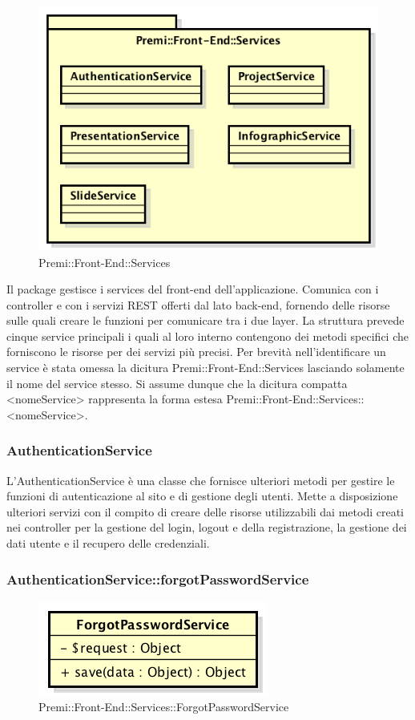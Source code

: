 \begin{figure}[h]
	\centering
	\includegraphics[width=0.7\linewidth]{img/premi_front_end_services}
	\caption[Premi::Front-End::Services]{Premi::Front-End::Services}
\end{figure}
Il package gestisce i services del \gls{front-end} dell'applicazione. Comunica con i controller e con i servizi \gls{REST} offerti dal lato \gls{back-end}, fornendo delle risorse sulle quali creare le funzioni per comunicare tra i due layer. La struttura prevede cinque service principali i quali al loro interno contengono dei metodi specifici che forniscono le risorse per dei servizi più precisi.
Per brevità nell'identificare un service è stata omessa la dicitura Premi::\gls{Front-End}::Services lasciando solamente il nome del service stesso. Si assume dunque che la dicitura compatta <nomeService> rappresenta la forma estesa Premi::\gls{Front-End}::Services::<nomeService>.
\newpage


\subsubsection{AuthenticationService}
L'AuthenticationService è una classe che fornisce ulteriori metodi per gestire le funzioni di autenticazione al sito e di gestione degli utenti. Mette a disposizione ulteriori servizi con il compito di creare delle risorse utilizzabili dai metodi creati nei controller per la gestione del login, logout e della registrazione, la gestione dei dati utente e il recupero delle credenziali.

		\subsubsection{AuthenticationService::forgotPasswordService}
		\begin{figure}[h]
			\centering
				\includegraphics[width=0.4\linewidth]{img/premi_front_end_services_forgotpasswordservice}
			\caption[Premi::Front-End::Services::ForgotPasswordService]{Premi::Front-End::Services::ForgotPasswordService}
		\end{figure}
		

